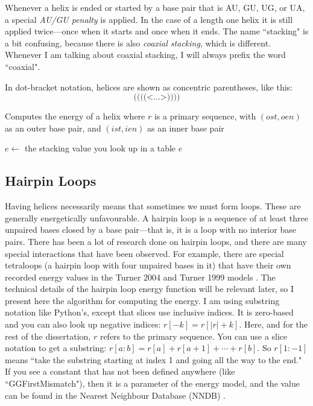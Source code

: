 \documentclass{cshonours}
\begin{document}
Whenever a helix is ended or started by a base pair that is AU, GU, UG, or UA, a special \emph{AU/GU penalty} is applied. In the case of a length one helix it is still applied twice---once when it starts and once when it ends. The name ``stacking" is a bit confusing, because there is also \emph{coaxial stacking}, which is different. Whenever I am talking about coaxial stacking, I will always prefix the word ``coaxial".

In dot-bracket notation, helices are shown as concentric parentheses, like this:
$$\texttt{((((<...>))))}$$

\begin{algorithm}[H]
\caption{Computes the energy of a helix where $r$ is a primary sequence, with $(ost, oen)$ as an outer base pair, and $(ist, ien)$ as an inner base pair}
\label{alg:stacking_energy}
\begin{algorithmic}
\State $e \gets$ the stacking value you look up in a table
\State \Return $e$
\EndFunction
\end{algorithmic}
\end{algorithm}

\subsection{Hairpin Loops}
Having helices necessarily means that sometimes we must form loops. These are generally energetically unfavourable. A hairpin loop is a sequence of at least three unpaired bases closed by a base pair---that is, it is a loop with no interior base pairs. There has been a lot of research done on hairpin loops, and there are many special interactions that have been observed. For example, there are special tetraloops (a hairpin loop with four unpaired bases in it) that have their own recorded energy values in the Turner 2004 and Turner 1999 models \cite{t99, t04}. The technical details of the hairpin loop energy function will be relevant later, so I present here the algorithm for computing the energy. I am using substring notation like Python's, except that slices use inclusive indices. It is zero-based and you can also look up negative indices: $r[-k] = r[|r| + k]$. Here, and for the rest of the dissertation, $r$ refers to the primary sequence. You can use a slice notation to get a substring: $r[a:b] = r[a] + r[a + 1] + \cdots + r[b]$. So $r[1:-1]$ means ``take the substring starting at index 1 and going all the way to the end." If you see a constant that has not been defined anywhere (like ``GGFirstMismatch"), then it is a parameter of the energy model, and the value can be found in the Nearest Neighbour Database (NNDB) \cite{tNndb}.
\end{document}
